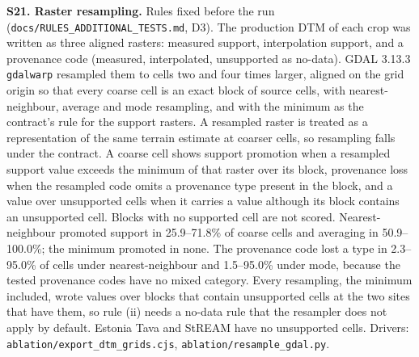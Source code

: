 \documentclass[11pt]{article}
\begin{document}
\vspace{4mm}
\noindent\textbf{S21. Raster resampling.} Rules fixed before the run (\texttt{docs/\allowbreak RULES\_\allowbreak ADDITIONAL\_\allowbreak TESTS.md}, D3). The production DTM of each crop was written as three aligned rasters: measured support, interpolation support, and a provenance code (measured, interpolated, unsupported as no-data). GDAL 3.13.3 \texttt{gdalwarp} resampled them to cells two and four times larger, aligned on the grid origin so that every coarse cell is an exact block of source cells, with nearest-neighbour, average and mode resampling, and with the minimum as the contract's rule for the support rasters. A resampled raster is treated as a representation of the same terrain estimate at coarser cells, so resampling falls under the contract. A coarse cell shows support promotion when a resampled support value exceeds the minimum of that raster over its block, provenance loss when the resampled code omits a provenance type present in the block, and a value over unsupported cells when it carries a value although its block contains an unsupported cell. Blocks with no supported cell are not scored. Nearest-neighbour promoted support in 25.9--71.8\% of coarse cells and averaging in 50.9--100.0\%; the minimum promoted in none. The provenance code lost a type in 2.3--95.0\% of cells under nearest-neighbour and 1.5--95.0\% under mode, because the tested provenance codes have no mixed category. Every resampling, the minimum included, wrote values over blocks that contain unsupported cells at the two sites that have them, so rule (ii) needs a no-data rule that the resampler does not apply by default. Estonia Tava and StREAM have no unsupported cells. Drivers: \texttt{ablation/export\_dtm\_grids.cjs}, \texttt{ablation/resample\_gdal.py}.
\end{document}
